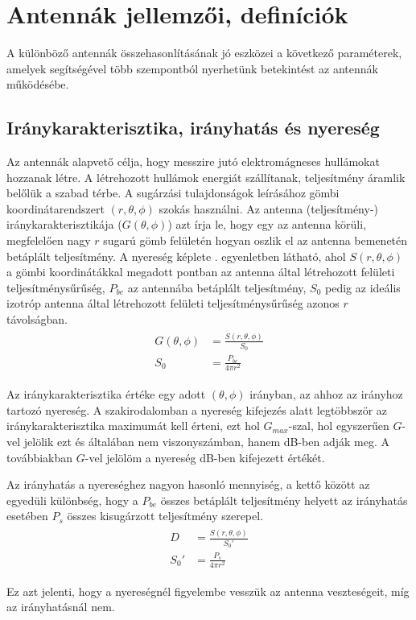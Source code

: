 \section{Antennák jellemzői, definíciók}
	A különböző antennák összehasonlításának jó eszközei a következő paraméterek, amelyek segítségével több szempontból nyerhetünk betekintést az antennák működésébe.
	\subsection{Iránykarakterisztika, irányhatás és nyereség}
		\par Az antennák alapvető célja, hogy messzire jutó elektromágneses hullámokat hozzanak létre. A létrehozott hullámok energiát szállítanak, teljesítmény áramlik belőlük a szabad térbe. A sugárzási tulajdonságok leírásához gömbi koordinátarendszert $(r, \theta, \phi)$ szokás használni. Az antenna (teljesítmény-) iránykarakterisztikája ($G(\theta, \phi)$) azt írja le, hogy egy az antenna körüli, megfelelően nagy $r$ sugarú gömb felületén hogyan oszlik el az antenna bemenetén betáplált teljesítmény. A nyereség képlete . egyenletben látható, ahol $S(r,\theta,\phi)$ a gömbi koordinátákkal megadott pontban az antenna által létrehozott felületi teljesítménysűrűség, $P_{be}$ az antennába betáplált teljesítmény, $S_0$ pedig az ideális izotróp antenna által létrehozott felületi teljesítménysűrűség azonos $r$ távolságban.
		\begin{align}
			\begin{split}
				\label{equ:G}
				G(\theta,\phi) & = \frac{S(r,\theta,\phi)}{S_0}\\
				S_0 & = \frac{P_{be}}{4\pi r^2}
			\end{split}
		\end{align}
		\par Az iránykarakterisztika értéke egy adott $(\theta, \phi)$ irányban, az ahhoz az irányhoz tartozó nyereség. A szakirodalomban a nyereség kifejezés alatt legtöbbször az iránykarakterisztika maximumát kell érteni, ezt hol $G_{max}$-szal, hol egyszerűen $G$-vel jelölik ezt és általában nem viszonyszámban, hanem dB-ben adják meg. A továbbiakban $G$-vel jelölöm a nyereség dB-ben kifejezett értékét.
		\par Az irányhatás a nyereséghez nagyon hasonló mennyiség, a kettő között az egyedüli különbség, hogy a $P_{be}$ összes betáplált teljesítmény helyett az irányhatás esetében $P_{s}$ összes kisugárzott teljesítmény szerepel.
		\begin{align}
			\begin{split}\label{equ:D}
				D & = \frac{S(r,\theta,\phi)}{S_0'}\\
				S_0' & = \frac{P_s}{4\pi r^2}
			\end{split}
		\end{align}
		\par Ez azt jelenti, hogy a nyereségnél figyelembe vesszük az antenna veszteségeit, míg az irányhatásnál nem.
